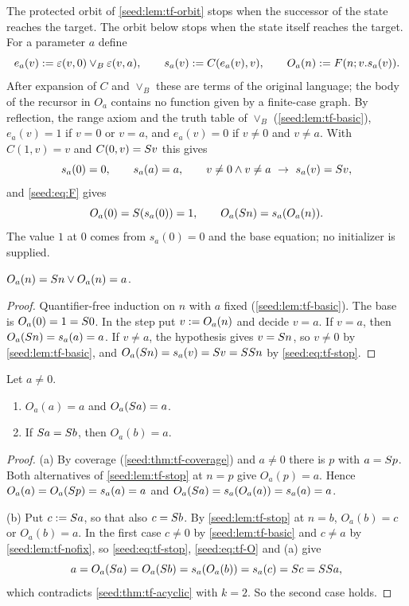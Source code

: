 The protected orbit of \cref{seed:lem:tf-orbit} stops when the successor of
the state reaches the target. The orbit below stops when the state itself
reaches the target. For a parameter $a$ define
\[
 e_a(v)\mathrel{:=}\varepsilon(v,0)\lor_B\varepsilon(v,a),\qquad
 s_a(v)\mathrel{:=} C(e_a(v),v),\qquad
 O_a(n)\mathrel{:=} F(n;v.s_a(v)).
\]
After expansion of $C$ and $\lor_B$ these are terms of the original language;
the body of the recursor in $O_a$ contains no function given by a finite-case
graph. By reflection, the range axiom and the truth table of $\lor_B$
(\cref{seed:lem:tf-basic}), $e_a(v)=1$ if $v=0$ or $v=a$, and $e_a(v)=0$ if
$v\neq0$ and $v\neq a$. With $C(1,v)=v$ and $C(0,v)=S v$ this gives
\begin{equation}\label{seed:eq:tf-stop}
 s_a(0)=0,\qquad s_a(a)=a,\qquad
 v\neq0\land v\neq a\ \to\ s_a(v)=S v,
\end{equation}
and \eqref{seed:eq:F} gives
\begin{equation}\label{seed:eq:tf-O}
 O_a(0)=S(s_a(0))=1,\qquad O_a(S n)=s_a(O_a(n)).
\end{equation}
The value $1$ at $0$ comes from $s_a(0)=0$ and the base equation; no
initializer is supplied.

\begin{lemma}\label{seed:lem:tf-stop}
$O_a(n)=S n\lor O_a(n)=a$.
\end{lemma}

\begin{proof}
Quantifier-free induction on $n$ with $a$ fixed (\cref{seed:lem:tf-basic}).
The base is $O_a(0)=1=S 0$. In the step put $v\mathrel{:=} O_a(n)$ and decide
$v=a$. If $v=a$, then $O_a(S n)=s_a(a)=a$. If $v\neq a$, the hypothesis
gives $v=S n$, so $v\neq0$ by \cref{seed:lem:tf-basic}, and
$O_a(S n)=s_a(v)=S v=SS n$ by \eqref{seed:eq:tf-stop}.
\end{proof}

\begin{lemma}[Absorption]\label{seed:lem:tf-absorb}
Let $a\neq0$.
\begin{enumerate}[label=(\alph*),nosep]
\item $O_a(a)=a$ and $O_a(S a)=a$.
\item If $S a=S b$, then $O_a(b)=a$.
\end{enumerate}
\end{lemma}

\begin{proof}
(a) By coverage (\cref{seed:thm:tf-coverage}) and $a\neq0$ there is $p$ with
$a=S p$. Both alternatives of \cref{seed:lem:tf-stop} at $n=p$ give
$O_a(p)=a$. Hence $O_a(a)=O_a(S p)=s_a(a)=a$ and
$O_a(S a)=s_a(O_a(a))=s_a(a)=a$.

(b) Put $c\mathrel{:=}S a$, so that also $c=S b$. By \cref{seed:lem:tf-stop}
at $n=b$, $O_a(b)=c$ or $O_a(b)=a$. In the first case $c\neq0$ by
\cref{seed:lem:tf-basic} and $c\neq a$ by \cref{seed:lem:tf-nofix}, so
\eqref{seed:eq:tf-stop}, \eqref{seed:eq:tf-O} and (a) give
\[
 a=O_a(S a)=O_a(S b)=s_a(O_a(b))=s_a(c)=S c=SS a,
\]
which contradicts \cref{seed:thm:tf-acyclic} with $k=2$. So the second case
holds.
\end{proof}

